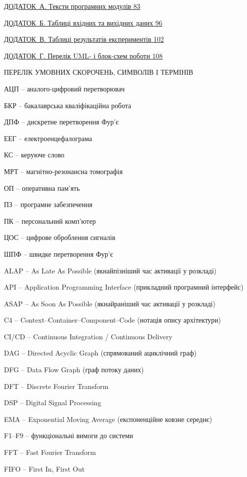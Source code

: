 \documentclass[
]{article}
\begin{document}
\hyperref[app:A]{ДОДАТОК~А. Тексти програмних модулів
\hyperref[app:A]{83}}

\hyperref[app:B]{ДОДАТОК~Б. Таблиці вхідних та вихідних даних
\hyperref[app:B]{96}}

\hyperref[app:V]{ДОДАТОК~В. Таблиці результатів експериментів
\hyperref[app:V]{102}}

\hyperref[app:G]{ДОДАТОК~Г. Перелік UML- і блок-схем роботи
\hyperref[app:G]{108}}

\protect{}\label{_Toc230379705}{}ПЕРЕЛІК УМОВНИХ СКОРОЧЕНЬ,
СИМВОЛІВ І ТЕРМІНІВ

АЦП -- аналого-цифровий перетворювач

БКР -- бакалаврська кваліфікаційна робота

ДПФ -- дискретне перетворення Фур'є

ЕЕГ -- електроенцефалограма

КС -- керуюче слово

МРТ -- магнітно-резонансна томографія

ОП -- оперативна пам'ять

ПЗ -- програмне забезпечення

ПК -- персональний комп'ютер

ЦОС -- цифрове оброблення сигналів

ШПФ -- швидке перетворення Фур'є

ALAP -- As Late As Possible (якнайпізніший час активації у розкладі)

API -- Application Programming Interface (прикладний програмний
інтерфейс)

ASAP -- As Soon As Possible (якнайраніший час активації у розкладі)

C4 -- Context--Container--Component--Code (нотація опису архітектури)

CI/CD -- Continuous Integration / Continuous Delivery

DAG -- Directed Acyclic Graph (спрямований ациклічний граф)

DFG -- Data Flow Graph (граф потоку даних)

DFT -- Discrete Fourier Transform

DSP -- Digital Signal Processing

EMA -- Exponential Moving Average (експоненційне ковзне середнє)

F1--F9 -- функціональні вимоги до системи

FFT -- Fast Fourier Transform

FIFO -- First In, First Out
\end{document}
